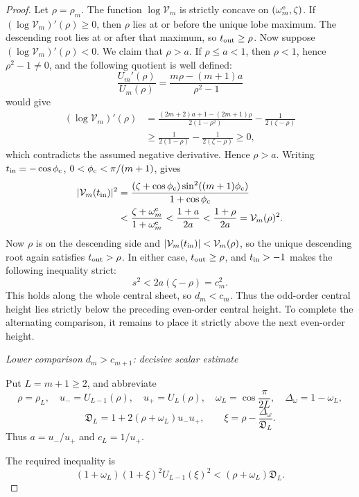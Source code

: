 \documentclass[a4paper,preprint,12pt,nopreprintline,sort&compress]{elsarticle}
\numberwithin{equation}{section}
\theoremstyle{remark}
\newcommand{\proofstage}[1]{%
  \par\medskip\noindent\textit{#1}\par\nobreak\smallskip}
\begin{document}
\begin{proof}
Let \(\rho=\rho_m\).  The function \(\log\mathcal V_m\) is strictly
concave on \((\omega_m^{\rm e},\zeta)\).  If
\((\log\mathcal V_m)'(\rho)\geq0\), then \(\rho\) lies at or before the
unique lobe maximum.  The descending root lies at or after that maximum, so
\(t_{\rm out}\geq\rho\).  Now suppose
\((\log\mathcal V_m)'(\rho)<0\).  We claim that \(\rho>a\).  If
\(\rho\leq a<1\), then \(\rho<1\), hence \(\rho^2-1\neq0\), and the
following quotient is well defined:
\[
 \frac{U_m'(\rho)}{U_m(\rho)}
 =\frac{m\rho-(m+1)a}{\rho^2-1}
\]
would give
\[
\begin{aligned}
 (\log\mathcal V_m)'(\rho)
 &=\frac{(2m+2)a+1-(2m+1)\rho}{2(1-\rho^2)}
   -\frac1{2(\zeta-\rho)}\\
 &\geq\frac1{2(1-\rho)}-\frac1{2(\zeta-\rho)}\geq0,
\end{aligned}
\]
which contradicts the assumed negative derivative.  Hence \(\rho>a\).
Writing \(t_{\rm in}=-\cos\phi_{\rm c}\),
\(0<\phi_{\rm c}<\pi/(m+1)\), gives
\[
\begin{aligned}
 |\mathcal V_m(t_{\rm in})|^2
 &=\frac{(\zeta+\cos\phi_{\rm c})
          \sin^2((m+1)\phi_{\rm c})}{1+\cos\phi_{\rm c}}\\
 &<\frac{\zeta+\omega_m^{\rm e}}{1+\omega_m^{\rm e}}
 <\frac{1+a}{2a}<\frac{1+\rho}{2a}=\mathcal V_m(\rho)^2.
\end{aligned}
\]
Now \(\rho\) is on the descending side and
\(|\mathcal V_m(t_{\rm in})|<\mathcal V_m(\rho)\), so the
unique descending root again satisfies \(t_{\rm out}>\rho\).  In either case,
\(t_{\rm out}\geq\rho\), and \(t_{\rm in}>-1\) makes the following
inequality strict:
\[
 s^2<2a(\zeta-\rho)=c_m^2.
\]
This holds along the whole central sheet, so \(d_m<c_m\).
Thus the odd-order central height lies strictly below the preceding
even-order central height.  To complete the alternating comparison, it
remains to place it strictly above the next even-order height.

\proofstage{Lower comparison \(d_m>c_{m+1}\): decisive scalar estimate}
Put \(L=m+1\geq2\), and abbreviate
\[
 \rho=\rho_L,\quad u_-=U_{L-1}(\rho),\quad u_+=U_L(\rho),\quad
 \omega_L=\cos\frac{\pi}{2L},\quad \Delta_\omega=1-\omega_L,
\]
\begin{equation}\label{eq:central-D-xi}
 \mathfrak D_L=1+2(\rho+\omega_L)u_-u_+,\qquad
 \xi=\rho-\frac{\Delta_\omega}{\mathfrak D_L}.
\end{equation}
Thus \(a=u_-/u_+\) and \(c_L=1/u_+\).

The required inequality is
\begin{equation}\label{eq:central-target}
 (1+\omega_L)(1+\xi)^2U_{L-1}(\xi)^2
 <(\rho+\omega_L)\mathfrak D_L.
\end{equation}


\end{proof}
\end{document}

